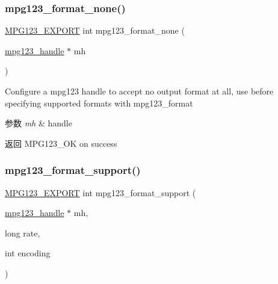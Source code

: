 \subsubsection{\texorpdfstring{mpg123\+\_\+format\+\_\+none()}{mpg123\_format\_none()}}
{\footnotesize\ttfamily \hyperlink{mpg123_8h_a2ba98cfba3f760879df70e755b2a61cc}{M\+P\+G123\+\_\+\+E\+X\+P\+O\+RT} int mpg123\+\_\+format\+\_\+none (\begin{DoxyParamCaption}\item[{\hyperlink{group__mpg123__init_ga6728e2839a395f3a07d4514da659faca}{mpg123\+\_\+handle} $\ast$}]{mh }\end{DoxyParamCaption})}

Configure a mpg123 handle to accept no output format at all, use before specifying supported formats with mpg123\+\_\+format 
\begin{DoxyParams}{参数}
{\em mh} & handle \\
\hline
\end{DoxyParams}
\begin{DoxyReturn}{返回}
M\+P\+G123\+\_\+\+OK on success 
\end{DoxyReturn}
\mbox{\label{group__mpg123__output_gae30accfd052c88aad47820c5bb149cda}} 
\subsubsection{\texorpdfstring{mpg123\+\_\+format\+\_\+support()}{mpg123\_format\_support()}}
{\footnotesize\ttfamily \hyperlink{mpg123_8h_a2ba98cfba3f760879df70e755b2a61cc}{M\+P\+G123\+\_\+\+E\+X\+P\+O\+RT} int mpg123\+\_\+format\+\_\+support (\begin{DoxyParamCaption}\item[{\hyperlink{group__mpg123__init_ga6728e2839a395f3a07d4514da659faca}{mpg123\+\_\+handle} $\ast$}]{mh,  }\item[{long}]{rate,  }\item[{int}]{encoding }\end{DoxyParamCaption})}

